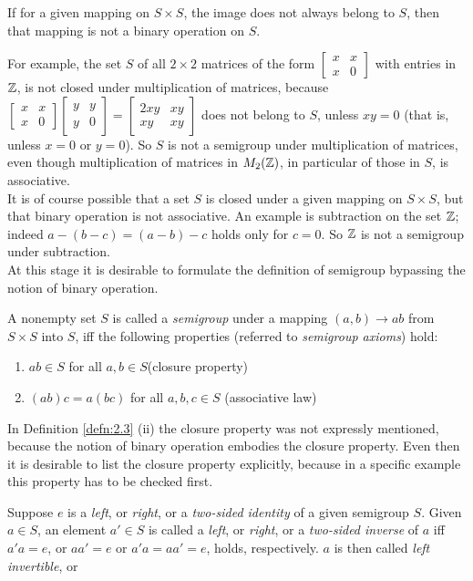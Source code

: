 \documentclass[12pt]{article}
\begin{document}
\begin{rem}
    If for a given mapping on $ S\times S $, the image does not always belong to $ S $, then that mapping is not a binary operation on $ S $.
\end{rem}
For example, the set $ S $ of all $ 2 \times 2 $ matrices of the form $ \begin{bmatrix}
    x & x\\
    x & 0
\end{bmatrix} $ with entries in $ \mathbb{Z} $, is not closed under multiplication of matrices, because $ \begin{bmatrix}
    x &x\\
    x &0
\end{bmatrix}\begin{bmatrix}
    y&y\\
    y&0
\end{bmatrix} =\begin{bmatrix}
    2xy &xy\\
    xy &xy
\end{bmatrix}$ does not belong to $ S $, unless $ xy=0 $ (that is, unless $ x=0 $ or $ y =0 $). So $ S $ is not a semigroup under multiplication of matrices, even though multiplication of matrices in $ M_2(\mathbb{Z}) $, in particular of those in $ S $, is associative.\\

It is of course possible that a set $ S $ is closed under a given mapping on $ S\times S $, but that binary operation is not associative. An example is subtraction on the set $ \mathbb{Z} $; indeed $ a - (b-c)=(a - b) - c $ holds only for $ c= 0 $. So $ \mathbb{Z} $ is not a semigroup under subtraction.\\

At this stage it is desirable to formulate the definition of semigroup bypassing the notion of binary operation.
\begin{defn}
    A nonempty set $ S $ is called a \emph{semigroup} under a mapping $ (a, b) \to ab $ from $ S\times S $ into $ S $, iff the following properties (referred to \emph{semigroup axioms}) hold:
    \begin{enumerate}
        \item $ ab \in S $ for all $ a, b \in S $(closure property)
        \item $ (ab)c = a(bc) $ for all $ a, b, c\in S $ (associative law)
    \end{enumerate}
\end{defn}

In Definition \ref{defn:2.3} (ii) the closure property was not expressly mentioned, because the notion of binary operation embodies the closure property. Even then it is desirable to list the closure property explicitly, because in a specific example this property has to be checked first.
\begin{defn}
    Suppose $ e $ is a \emph{left}, or \emph{right}, or a \emph{two-sided identity} of a given semigroup $ S $. Given $ a \in S $, an element $ a' \in S $ is called a \emph{left}, or \emph{right}, or a \emph{two-sided inverse} of $ a $ iff $ a'a = e $, or $ aa'=e $ or $ a'a=aa'=e $, holds, respectively. $ a $ is then called \emph{left invertible}, or
\end{defn} 
\end{document}
